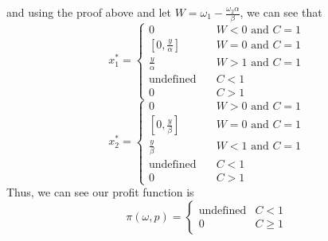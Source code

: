 \documentclass[11pt]{article}
\begin{document}
and using the proof above and let $W = \omega_1 - \frac{\omega_2 \alpha}{\beta}$, we can see that 
\[
x_1^* = \begin{cases}
    0 & \quad W < 0 \text{ and } C = 1\\
    [0, \frac{y}{\alpha}] & \quad W = 0 \text{ and } C = 1\\
    \frac{y}{\alpha} & \quad W > 1 \text{ and } C = 1\\
    \text{undefined} & \quad C < 1\\
    0 & \quad C > 1
\end{cases}
\]
\[
x_2^* = \begin{cases}
    0 & \quad W > 0 \text{ and } C = 1\\
    [0, \frac{y}{\beta}] & \quad W = 0 \text{ and } C = 1\\
    \frac{y}{\beta} & \quad W < 1 \text{ and } C = 1\\
    \text{undefined} & \quad C < 1\\
    0 & \quad C > 1
\end{cases}
\]
Thus, we can see our profit function is 
\[
\pi(\omega, p) = \begin{cases}
    \text{undefined} & C <1\\
    0 & C \geq 1
\end{cases}
\]
\section{}
\end{document}

